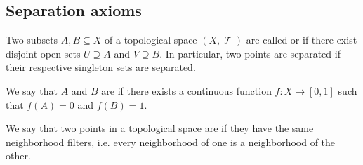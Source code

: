 \subsection{Separation axioms}\label{subsec:separation_axioms}

\begin{definition}\label{def:topological_space_separation}
  Two subsets \( A, B \subseteq X \) of a topological space \( (X, \mscrT) \) are called  or  if there exist disjoint open sets \( U \supseteq A \) and \( V \supseteq B \). In particular, two points are separated if their respective singleton sets are separated.

  We say that \( A \) and \( B \) are  if there exists a continuous function \( f: X \to [0, 1] \) such that \( f(A) = 0 \) and \( f(B) = 1 \).
\end{definition}

\begin{definition}\label{def:topologically_indistinguishable}\mimprovised
  We say that two points in a topological space are  if they have the same \hyperref[def:neighborhood_system]{neighborhood filters}, i.e. every neighborhood of one is a neighborhood of the other.
\end{definition}

